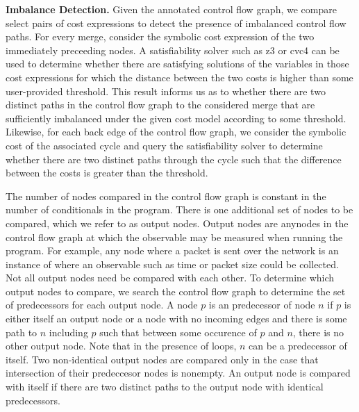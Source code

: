 \textbf{Imbalance Detection.} Given the annotated control flow graph, we compare select pairs of cost expressions to detect the presence of imbalanced control flow paths. For every merge, consider the symbolic cost expression of the two immediately preceeding nodes. A satisfiability solver such as z3 \cite{z3} or cvc4 \cite{cvc4} can be used to determine whether there are satisfying solutions of the variables in those cost expressions for which the distance between the two costs is higher than some user-provided threshold. This result informs us as to whether there are two distinct paths in the control flow graph to the considered merge that are sufficiently imbalanced under the given cost model according to some threshold. Likewise, for each back edge of the control flow graph, we consider the symbolic cost of the associated cycle and query the satisfiability solver to determine whether there are two distinct paths through the cycle such that the difference between the costs is greater than the threshold. 


The number of nodes compared in the control flow graph is constant in the number of conditionals in the program. There is one additional set of nodes to be compared, which we refer to as output nodes. Output nodes are anynodes in the control flow graph at which the observable may be measured when running the program. For example, any node where a packet is sent over the network is an instance of where an observable such as time or packet size could be collected. Not all output nodes need be compared with each other. To determine which output nodes to compare, we search the control flow graph to determine the set of predecessors for each output node. A node $p$ is an predecessor of node $n$ if $p$ is either itself an output node or a node with no incoming edges and there is some path to $n$ including $p$ such that between some occurence of $p$ and $n$, there is no other output node. Note that in the presence of loops, $n$ can be a predecessor of itself. Two non-identical output nodes are compared only in the case that intersection of their predeccesor nodes is nonempty. An output node is compared with itself if there are two distinct paths to the output node with identical predecessors.  

